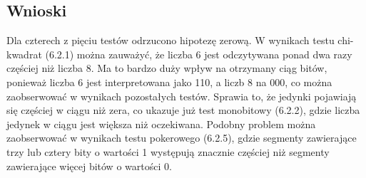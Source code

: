 \subsection{Wnioski}
Dla czterech z pięciu testów odrzucono hipotezę zerową. W wynikach testu chi-kwadrat (6.2.1) można zauważyć, że liczba
6 jest odczytywana ponad dwa razy częściej niż liczba 8. Ma to bardzo duży wpływ na otrzymany ciąg bitów, ponieważ liczba
6 jest interpretowana jako 110, a liczb 8 na 000, co można zaobserwować w wynikach pozostałych testów. Sprawia to, że 
jedynki pojawiają się częściej w ciągu niż zera, co ukazuje już test monobitowy (6.2.2), gdzie liczba jedynek w ciągu
jest większa niż oczekiwana. Podobny problem można zaobserwować w wynikach testu pokerowego (6.2.5), gdzie segmenty
zawierające trzy lub cztery bity o wartości 1 występują znacznie częściej niż segmenty zawierające więcej bitów o 
wartości 0. 